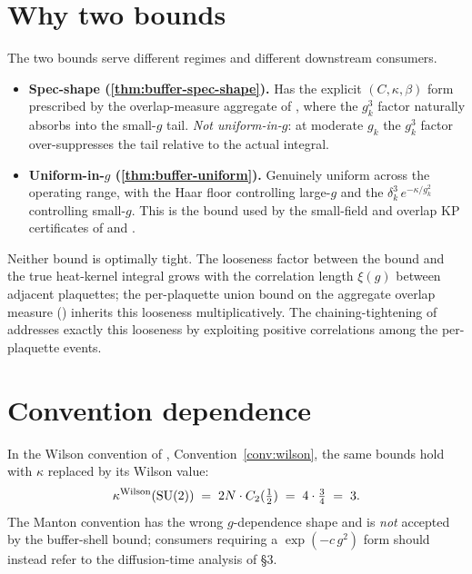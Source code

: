 \section{Why two bounds}
\label{sec:two-bounds-rationale}

The two bounds serve different regimes and different downstream
consumers.

\begin{itemize}
  \item \textbf{Spec-shape (\cref{thm:buffer-spec-shape}).}  Has the
    explicit $(C, \kappa, \beta)$ form prescribed by the
    overlap-measure aggregate of , where
    the $g_k^3$ factor naturally absorbs into the small-$g$ tail.
    \emph{Not uniform-in-$g$}: at moderate $g_k$ the $g_k^3$ factor
    over-suppresses the tail relative to the actual integral.
  \item \textbf{Uniform-in-$g$ (\cref{thm:buffer-uniform}).}
    Genuinely uniform across the operating range, with the Haar
    floor controlling large-$g$ and the
    $\delta_k^3\,e^{-\kappa/g_k^2}$ controlling small-$g$.  This is
    the bound used by the small-field and overlap KP certificates
    of  and .
\end{itemize}

%
Neither bound is optimally tight.  The looseness factor between
the bound and the true heat-kernel integral grows with the
correlation length $\xi(g)$ between adjacent plaquettes; the
per-plaquette union bound on the aggregate overlap measure
() inherits this looseness multiplicatively.
The chaining-tightening of  addresses
exactly this looseness by exploiting positive correlations among
the per-plaquette events.

\section{Convention dependence}
\label{sec:buffer-convention}

In the Wilson convention of ,
Convention~\ref{conv:wilson}, the same bounds hold with $\kappa$
replaced by its Wilson value:
\begin{equation}
  \label{eq:wilson-kappa}
  \kappa^{\mathrm{Wilson}}(\mathrm{SU}(2)) \;=\; 2N \cdot C_2(\tfrac12) \;=\; 4 \cdot \tfrac34 \;=\; 3 .
\end{equation}
The Manton convention has the wrong $g$-dependence shape and is
\emph{not} accepted by the buffer-shell bound; consumers requiring
a $\exp(-c\, g^2)$ form should instead refer to the diffusion-time
analysis of \cite{Balaban1988RG-II} \S3.

